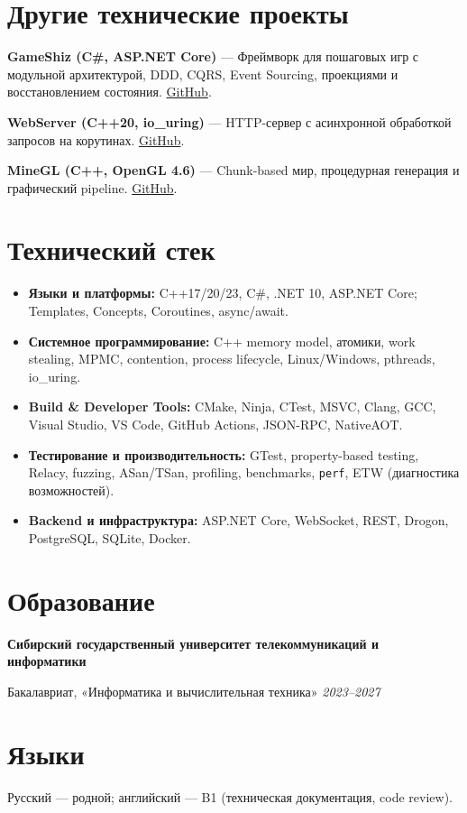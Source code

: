 \documentclass[a4paper,10pt]{article}
\newcommand{\smallproject}[3]{%
    \noindent\textbf{#1} --- #2
    \href{#3}{GitHub}.\par\vspace{2pt}
}
\begin{document}
\section*{Другие технические проекты}

\smallproject
    {GameShiz (C\#, ASP.NET Core)}
    {Фреймворк для пошаговых игр с модульной архитектурой,
    DDD, CQRS, Event Sourcing, проекциями
    и восстановлением состояния.}
    {https://github.com/cpp20120/GameShiz}

\smallproject
    {WebServer (C++20, io\_uring)}
    {HTTP-сервер с асинхронной обработкой запросов
    на корутинах.}
    {https://github.com/cpp20120/OldGithub/tree/main/WebServer}

\smallproject
    {MineGL (C++, OpenGL 4.6)}
    {Chunk-based мир, процедурная генерация
    и графический pipeline.}
    {https://github.com/cpp20120/OldGithub/tree/main/MineGL}


\section*{Технический стек}

\begin{itemize}
    \item \textbf{Языки и платформы:}
    C++17/20/23, C\#, .NET 10, ASP.NET Core;
    Templates, Concepts, Coroutines, async/await.

    \item \textbf{Системное программирование:}
    C++ memory model, атомики, work stealing,
    MPMC, contention, process lifecycle,
    Linux/Windows, pthreads, io\_uring.

    \item \textbf{Build \& Developer Tools:}
    CMake, Ninja, CTest, MSVC, Clang, GCC,
    Visual Studio, VS Code, GitHub Actions,
    JSON-RPC, NativeAOT.

    \item \textbf{Тестирование и производительность:}
    GTest, property-based testing, Relacy,
    fuzzing, ASan/TSan, profiling,
    benchmarks, \texttt{perf},
    ETW (диагностика возможностей).

    \item \textbf{Backend и инфраструктура:}
    ASP.NET Core, WebSocket, REST,
    Drogon, PostgreSQL, SQLite, Docker.
\end{itemize}


\section*{Образование}

\textbf{Сибирский государственный университет
телекоммуникаций и информатики}\par

Бакалавриат, «Информатика и вычислительная техника»
\hfill \textit{2023--2027}

\section*{Языки}

Русский --- родной;
английский --- B1 (техническая документация, code review).
\end{document}

